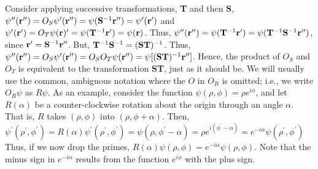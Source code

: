 Consider applying successive transformations, {\bf T} and then {\bf 
S}, $\psi^{\prime\prime}({\bf r}^{\prime\prime}) = O_S\psi^{\prime}({\bf 
r}^{\prime\prime}) = \psi({\bf S}^{-1}{\bf 
r}^{\prime\prime}) = \psi^{\prime}({\bf r}^{\prime})$ and 
$\psi^{\prime}({\bf r}^{\prime}) = O_T \psi({\bf r})^{\prime} = 
\psi({\bf T}^{-1}{\bf r}^{\prime}) = \psi({\bf r})$.  Thus, 
$\psi^{\prime\prime}( {\bf r}^{\prime\prime}) = \psi({\bf T}^{-1} 
{\bf r}^{\prime}) = \psi( {\bf T}^{-1} {\bf S}^{-1} {\bf 
r}^{\prime\prime})$, since ${\bf r}^{\prime} = {\bf S}^{-1} 
{\bf r}^{\prime\prime}$.  But, ${\bf T}^{-1}{\bf S}^{-1} = ({\bf 
ST})^{-1}$.  Thus,
$\psi^{\prime\prime} ( {\bf r}^{\prime\prime} ) = O_S 
\psi^{\prime} ( {\bf r}^{\prime\prime} ) = O_S O_T \psi 
( {\bf r}^{\prime\prime} ) = \psi [ ( {\bf ST} )^{-1} 
{\bf r}^{\prime\prime} ]$.  
Hence, the product of $O_S$ and $O_T$ is equivalent to the 
transformation {\bf ST}, just as it should be.  We will usually use 
the common, ambiguous notation where the $O$ in $O_R$ is omitted; i.e., 
we write $O_R\psi$ as $R \psi$.  As an example, consider the 
function $\psi(\rho,\phi) = \rho e^{i\phi}$, and let $R(\alpha)$ be a 
counter-clockwise rotation about the origin through an angle 
$\alpha$.  That is, $R$ takes $(\rho,\phi)$ into 
$(\rho,\phi+\alpha)$.  Then, $\psi^{\prime} (\rho^{\prime}, 
\phi^{\prime}) = R(\alpha) 
\psi^{\prime}(\rho^{\prime},\phi^{\prime})= 
\psi(\rho,\phi^{\prime} - \alpha) = \rho e^{i(\phi^{\prime}-\alpha)} = 
e^{-i\alpha} \psi(\rho^{\prime} , \phi^{\prime})$
\begin{equation}
\end{equation}
Thus, if we now drop the primes, $R(\alpha)\psi(\rho,\phi) = 
e^{-i\alpha} \psi(\rho,\phi)$.  Note that the minus sign in 
$e^{-i\alpha}$ results from the function $e^{i\phi}$ with the plus 
sign.

